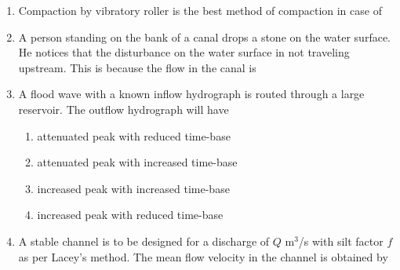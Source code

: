 \documentclass[journal]{IEEEtran}
\begin{document}
\begin{enumerate}
\item 
Compaction by vibratory roller is the best method of compaction in case of  \hfill {}
\begin{enumerate}
\end{enumerate}

\item A person standing on the bank of a canal drops a stone on the water surface. He notices that the disturbance on the water surface in not traveling upstream. This is because the flow in the canal is \hfill {}
\begin{enumerate}
\end{enumerate}


\item A flood wave with a known inflow hydrograph is routed through a large reservoir. The outflow hydrograph will have \hfill {}

\begin{enumerate}
\item attenuated peak with reduced time-base 
\item attenuated peak with increased time-base 
\item increased peak with increased time-base 
\item increased peak with reduced time-base

\end{enumerate}


\item A stable channel is to be designed for a discharge of $Q$ m$^{3}$/s with silt factor $f$ as per Lacey's method. The mean flow velocity  in the channel is obtained by \hfill {}
\begin{enumerate}
\end{enumerate}


\end{enumerate}
\end{document}

